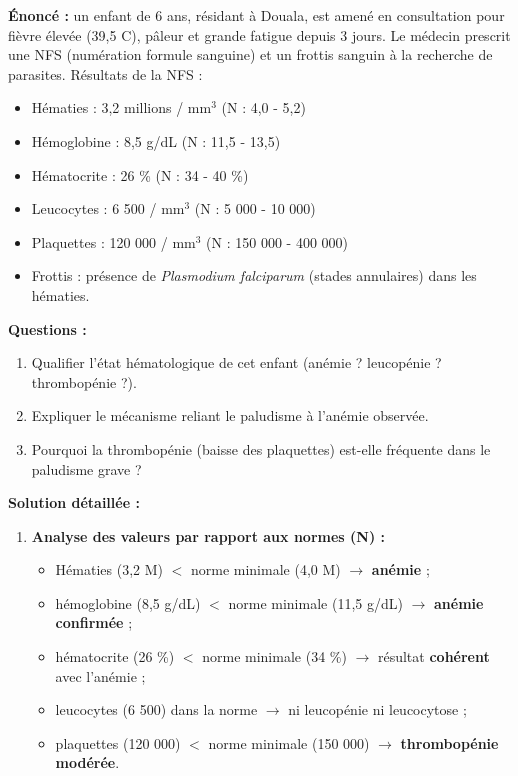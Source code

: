 \documentclass[11pt]{article}
\begin{document}
\begin{exoresolu}
\textbf{Énoncé :} un enfant de 6 ans, résidant à Douala, est amené en consultation pour fièvre élevée (39,5 \degres C), pâleur et grande fatigue depuis 3 jours. Le médecin prescrit une NFS (numération formule sanguine) et un frottis sanguin à la recherche de parasites. Résultats de la NFS :
\begin{itemize}
    \item Hématies : 3,2 millions / mm$^3$ (N : 4,0 - 5,2)
    \item Hémoglobine : 8,5 g/dL (N : 11,5 - 13,5)
    \item Hématocrite : 26 \% (N : 34 - 40 \%)
    \item Leucocytes : 6 500 / mm$^3$ (N : 5 000 - 10 000)
    \item Plaquettes : 120 000 / mm$^3$ (N : 150 000 - 400 000)
    \item Frottis : présence de \emph{Plasmodium falciparum} (stades annulaires) dans les hématies.
\end{itemize}
\textbf{Questions :}
\begin{enumerate}
    \item Qualifier l'état hématologique de cet enfant (anémie ? leucopénie ? thrombopénie ?).
    \item Expliquer le mécanisme reliant le paludisme à l'anémie observée.
    \item Pourquoi la thrombopénie (baisse des plaquettes) est-elle fréquente dans le paludisme grave ?
\end{enumerate}
\tcblower
\textbf{Solution détaillée :}
\begin{enumerate}
    \item \textbf{Analyse des valeurs par rapport aux normes (N) :}
    \begin{itemize}
        \item Hématies (3,2 M) $<$ norme minimale (4,0 M) $\to$ \textbf{anémie} ;
        \item hémoglobine (8,5 g/dL) $<$ norme minimale (11,5 g/dL) $\to$ \textbf{anémie confirmée} ;
        \item hématocrite (26 \%) $<$ norme minimale (34 \%) $\to$ résultat \textbf{cohérent} avec l'anémie ;
        \item leucocytes (6 500) dans la norme $\to$ ni leucopénie ni leucocytose ;
        \item plaquettes (120 000) $<$ norme minimale (150 000) $\to$ \textbf{thrombopénie modérée}.

\end{itemize}
\end{enumerate}
\end{exoresolu}
\end{document}
